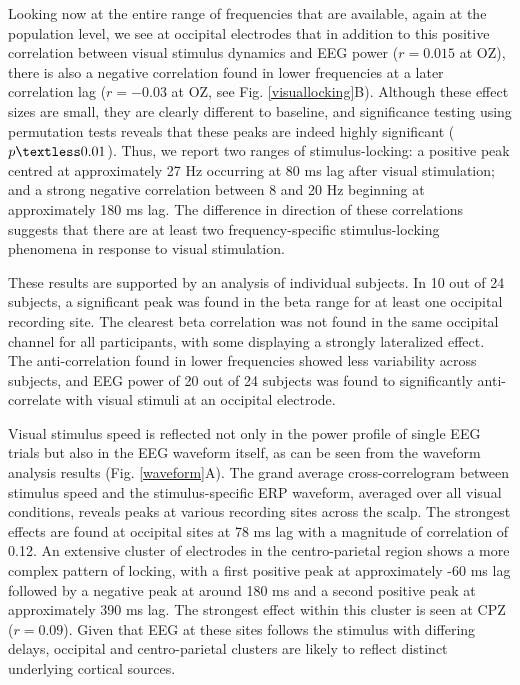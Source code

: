 Looking now at the entire range of frequencies that are available, again at
the population level, we see at occipital electrodes that in addition to
this positive correlation between visual stimulus dynamics and EEG power
($r = 0.015$ at OZ), there is also a negative correlation found in lower
frequencies at a later correlation lag ($r =-0.03$ at OZ, see Fig.
\ref{visuallocking}B).  Although these effect sizes are small, they are
clearly different to baseline, and significance testing using permutation
tests reveals that these peaks are indeed highly significant ($p \textless
0.01$). Thus, we report two ranges of stimulus-locking: a positive peak
centred at approximately 27 Hz occurring at 80 ms lag after visual
stimulation; and a strong negative correlation between 8 and 20 Hz
beginning at approximately 180 ms lag. The difference in direction of these
correlations suggests that there are at least two frequency-specific
stimulus-locking phenomena in response to visual stimulation.


These results are supported by an analysis of individual subjects. In 10
out of 24 subjects, a significant peak was found in the beta range for at
least one occipital recording site. The clearest beta correlation was not
found in the same occipital channel for all participants, with some
displaying a strongly lateralized effect. The anti-correlation found in
lower frequencies showed less variability across subjects, and EEG power of
20 out of 24 subjects was found to significantly anti-correlate with visual
stimuli at an occipital electrode. 



Visual stimulus speed is reflected not only in the power profile of single
EEG trials but also in the EEG waveform itself, as can be seen from the
waveform analysis results (Fig. \ref{waveform}A). The grand average cross-correlogram
between stimulus speed and the stimulus-specific ERP waveform, averaged
over all visual conditions, reveals peaks at various recording sites across
the scalp. The strongest effects are found at occipital sites at 78 ms lag
with a magnitude of correlation of 0.12. An extensive cluster of electrodes
in the centro-parietal region shows a more complex pattern of locking, with
a first positive peak at approximately -60 ms lag followed by a negative
peak at around 180 ms and a second positive peak at approximately 390 ms
lag. The strongest effect within this cluster is seen at CPZ ($r = 0.09$).
Given that EEG at these sites follows the stimulus with differing delays,
occipital and centro-parietal clusters are likely to reflect distinct
underlying cortical sources. 

